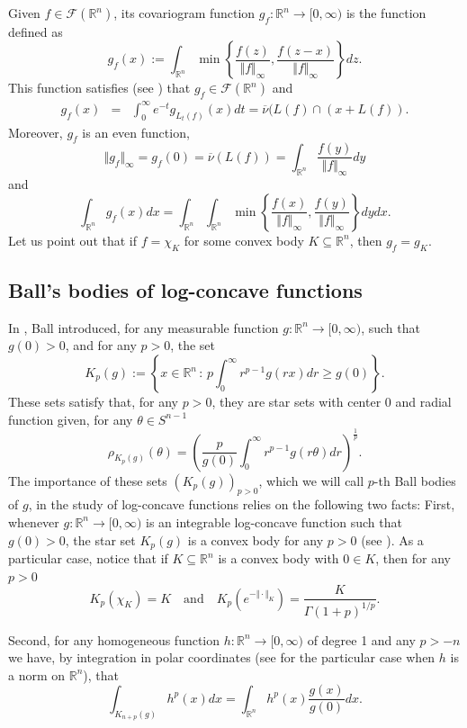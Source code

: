 \documentclass{amsart}
\newcommand{\R}{\mathbb R}
\theoremstyle{remark}
\theoremstyle{definition}
\numberwithin{equation}{section}
\begin{document}
Given $f\in\mathcal{F}(\R^n)$, its covariogram function $g_f:\R^n\to[0,\infty)$ is the function defined as
$$
g_f(x):=\int_{\R^n}\min\left\{\frac{f(z)}{\Vert f\Vert_\infty},\frac{f(z-x)}{\Vert f\Vert_\infty}\right\}dz.
$$
This function satisfies (see \cite[Lem. 2.2.1]{ABG1}) that $g_f\in\mathcal{F}(\R^n)$ and
\begin{eqnarray}\label{eq:Covariogram}
g_f(x)&=&\int_0^\infty e^{-t}g_{L_t(f)}(x)dt=\overline{\nu}(L(f)\cap(x+ L(f)).
\end{eqnarray}
Moreover, $g_f$ is an even function,
$$
\Vert g_f\Vert_\infty=g_f(0)=\overline{\nu}(L(f))=\int_{\R^n}\frac{f(y)}{\Vert f\Vert_\infty}dy
$$
and
\begin{equation}\label{eq:IntegralFunctionalCovariogram}
\int_{\R^n}g_f(x)dx=\int_{\R^n}\int_{\R^n}\min\left\{\frac{f(x)}{\Vert f\Vert_\infty},\frac{f(y)}{\Vert f\Vert_\infty}\right\}dydx.
\end{equation}
Let us point out that if $f=\chi_K$ for some convex body $K\subseteq\R^n$, then $g_f=g_K$.

\subsection{Ball's bodies of log-concave functions}


In \cite{Ba}, Ball introduced, for any measurable function $g:\R^n\to[0,\infty)$, such that $g(0)>0$, and for any $p>0$, the set
$$
K_p(g):=\left\{x\in\R^n\,:\,p\int_0^\infty r^{p-1}g(rx)dr\geq g(0)\right\}.
$$
These sets satisfy that, for any $p>0$, they are star sets with center $0$ and radial function given, for any $\theta\in S^{n-1}$
$$
\rho_{K_p(g)}(\theta)=\left(\frac{p}{g(0)}\int_0^\infty r^{p-1}g(r\theta)dr\right)^\frac{1}{p}.
$$
The importance of these sets $(K_p(g))_{p>0}$, which we will call $p$-th Ball bodies of $g$, in the study of log-concave functions relies on the following two facts: First, whenever $g:\R^n\to[0,\infty)$ is an integrable log-concave function such that $g(0)>0$, the star set $K_p(g)$ is a convex body for any $p>0$ (see \cite[Thm. 2.5.5, Lem. 2.5.6, and Prop. 2.5.7]{BGVV}). As a particular case, notice that if $K\subseteq\R^n$ is a convex body with $0\in K$, then for any $p>0$
$$
K_p(\chi_K)=K\quad\textrm{and}\quad K_p\left(e^{-\Vert\cdot\Vert_K}\right)=\frac{K}{\Gamma\left(1+p\right)^{1/p}}.
$$

Second, for any homogeneous function $h:\R^n\to[0,\infty)$ of degree 1 and any $p>-n$ we have, by integration in polar coordinates (see \cite[Prop. 2.5.3]{BGVV} for the particular case when $h$ is a norm on $\R^n$), that
$$
\int_{K_{n+p}(g)}h^p(x)dx=\int_{\R^n}h^p(x)\frac{g(x)}{g(0)}dx.
$$
\end{document}
